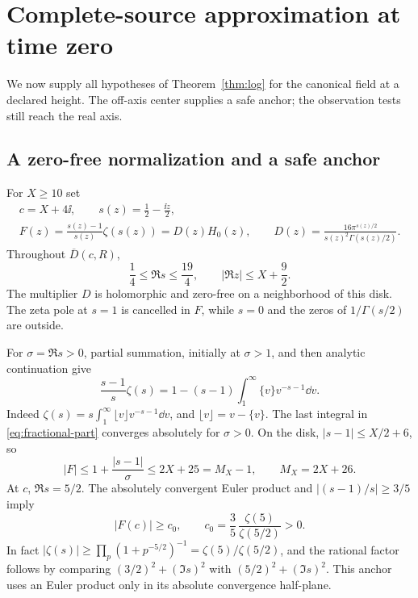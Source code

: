 \section{Complete-source approximation at time zero}\label{sec:canonical}

We now supply all hypotheses of Theorem~\ref{thm:log} for the canonical
field at a declared height. The off-axis center supplies a safe anchor;
the observation tests still reach the real axis.

\subsection{A zero-free normalization and a safe anchor}

For $X\ge10$ set
\begin{equation}\label{eq:canonical-F}
 \begin{gathered}
 c=X+4\ii,\qquad s(z)=\frac12-\frac{\ii z}2,\\
 F(z)=\frac{s(z)-1}{s(z)}\zeta(s(z))
     =D(z)H_0(z),\qquad
 D(z)=\frac{16\pi^{s(z)/2}}{s(z)^2\Gamma(s(z)/2)} .
 \end{gathered}
\end{equation}
Throughout $\overline D(c,R)$,
\begin{equation}\label{eq:s-range}
 \frac14\le\Re s\le\frac{19}4,\qquad
 |\Re z|\le X+\frac92 .
\end{equation}
The multiplier $D$ is holomorphic and zero-free on a neighborhood
of this disk. The zeta pole at $s=1$ is cancelled in $F$, while
$s=0$ and the zeros of $1/\Gamma(s/2)$ are outside.

For $\sigma=\Re s>0$, partial summation, initially at $\sigma>1$,
and then analytic continuation give
\begin{equation}\label{eq:fractional-part}
 \frac{s-1}{s}\zeta(s)
 =1-(s-1)\int_1^\infty\{v\}v^{-s-1}\dd v .
\end{equation}
Indeed $\zeta(s)=s\int_1^\infty\lfloor v\rfloor v^{-s-1}\dd v$,
and $\lfloor v\rfloor=v-\{v\}$. The last integral in
\eqref{eq:fractional-part} converges absolutely for $\sigma>0$.
On the disk, $|s-1|\le X/2+6$, so
\begin{equation}\label{eq:canonical-upper}
 |F|\le1+\frac{|s-1|}{\sigma}\le2X+25=M_X-1,
 \qquad M_X=2X+26 .
\end{equation}
At $c$, $\Re s=5/2$. The absolutely convergent Euler product
\cite{DLMFEulerProductOC} and $|(s-1)/s|\ge3/5$ imply
\begin{equation}\label{eq:c0}
 |F(c)|\ge c_0,\qquad
 c_0=\frac35\,\frac{\zeta(5)}{\zeta(5/2)}>0 .
\end{equation}
In fact
$|\zeta(s)|\ge\prod_p(1+p^{-5/2})^{-1}
=\zeta(5)/\zeta(5/2)$, and the rational factor follows by comparing
$(3/2)^2+(\Im s)^2$ with $(5/2)^2+(\Im s)^2$.
This anchor uses an Euler product only in its absolute convergence
half-plane.


